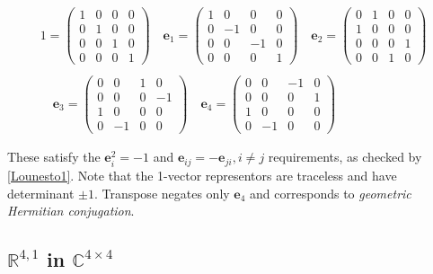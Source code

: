 \documentclass[a4paper]{book}
\numberwithin{equation}{chapter}
\begin{document}
\begin{align*}
    1 =
\begin{pmatrix}
  1&  0&  0&0 \\
  0&  1&  0&0 \\
  0&  0&  1&0 \\
  0&  0&  0&1
\end{pmatrix}
\quad
\mathbf{e}_1=
\begin{pmatrix}
  1&  0&  0&0 \\
  0&  -1&  0&0 \\
  0&  0&  -1&0 \\
  0&  0&  0&1
\end{pmatrix}
\quad
\mathbf{e}_2=
\begin{pmatrix}
  0&  1&  0&0 \\
  1&  0&  0&0 \\
  0&  0&  0&1 \\
  0&  0&  1&0
\end{pmatrix}
\\
\\
\quad
\mathbf{e}_3=
\begin{pmatrix}
  0&  0&  1&0 \\
  0&  0&  0&-1 \\
  1&  0&  0&0 \\
  0&  -1&  0&0
\end{pmatrix}
\quad
\mathbf{e}_4=
\begin{pmatrix}
  0&  0&  -1&0 \\
  0&  0&  0&1 \\
  1&  0&  0&0 \\
  0&  -1&  0&0
\end{pmatrix}
\end{align*}

These satisfy the $\mathbf{e}_i^2=-1$ and $\mathbf{e}_{ij}=-\mathbf{e}_{ji},
i\neq j$
requirements, as checked by \ref{Lounesto1}. Note that the 1-vector
representors are traceless and have determinant $\pm1$. Transpose negates
only $\mathbf{e}_4$ and corresponds to \emph{geometric Hermitian conjugation}.
    
    \subsection{$\mathbb{R}^{4,1}$ in $\mathbb{C}^{4 \times 4}$}
\end{document}

